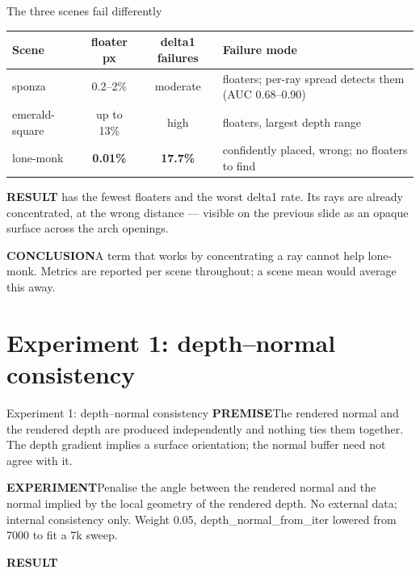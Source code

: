 \documentclass[aspectratio=169,9pt]{beamer}
\makeatletter
\newcommand{\code}[1]{{\ttfamily\fontsize{0.92\f@size}{\f@baselineskip}\selectfont #1}}
\newcommand{\lbl}[1]{\textcolor{lblcol}{\scriptsize\bfseries #1}\hspace{0.5em}}
\newcommand{\pre}{\lbl{PREMISE}}
\newcommand{\expt}{\lbl{EXPERIMENT}}
\newcommand{\res}{\lbl{RESULT}}
\newcommand{\conc}{\lbl{CONCLUSION}}
\makeatother
\begin{document}
\begin{frame}{The three scenes fail differently}
  \begin{center}\small
  \begin{tabular}{lccl}
    \toprule
    Scene & floater px & \code{delta1} failures & Failure mode \\
    \midrule
    \code{sponza}         & 0.2--2\%  & moderate & floaters; per-ray spread detects them (AUC 0.68--0.90) \\
    \code{emerald-square} & up to 13\% & high    & floaters, largest depth range \\
    \code{lone-monk}      & \textbf{0.01\%} & \textbf{17.7\%} & confidently placed, wrong; no floaters to find \\
    \bottomrule
  \end{tabular}
  \end{center}
  \vspace{0.6em}
  \res \code{lone-monk} has the fewest floaters and the worst \code{delta1} rate. Its rays are
  already concentrated, at the wrong distance --- visible on the previous slide as an opaque
  surface across the arch openings.

  \conc A term that works by concentrating a ray cannot help \code{lone-monk}. Metrics are
  reported per scene throughout; a scene mean would average this away.
\end{frame}

\section{Experiment 1: depth--normal consistency}

\begin{frame}{Experiment 1: depth--normal consistency}
  \pre The rendered normal and the rendered depth are produced independently and nothing ties
  them together. The depth gradient implies a surface orientation; the normal buffer need not
  agree with it.

  \expt Penalise the angle between the rendered normal and the normal implied by the local
  geometry of the rendered depth. No external data; internal consistency only. Weight 0.05,
  \code{depth\_normal\_from\_iter} lowered from 7000 to fit a 7k sweep.

  \res
  \begin{center}\scriptsize
    
  \end{center}
\end{frame}
\end{document}
